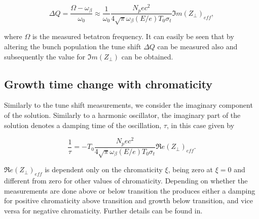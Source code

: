 \begin{equation}
\Delta Q = \frac{\Omega - \omega_{\beta}}{\omega_{0}} \approx \frac{1}{\omega_{0}} \frac{N_{p}ec^{2}}{4\sqrt{\pi}\omega_{\beta} \left( E/e \right)T_{0}\sigma_{t}} \Im{}m\left(  Z_{\perp} \right)_{eff},
\end{equation} 

where $\Omega$ is the measured betatron frequency. It can easily be seen that by altering the bunch population the tune shift $\Delta Q$ can be measured also and subsequently the value for $\Im{}m\left(  Z_{\perp} \right)$ can be obtained.

\subsection{Growth time change with chromaticity}

Similarly to the tune shift measurements, we consider the imaginary component of the solution. Similarly to a harmonic oscillator, the imaginary part of the solution denotes a damping time of the oscillation, $\tau$, in this case given by

\begin{equation}
\frac{1}{\tau} = -T_{0} \frac{N_{p}ec^{2}}{4\sqrt{\pi}\omega_{\beta} \left( E/e \right)T_{0}\sigma_{t}} \Re{}e\left(  Z_{\perp} \right)_{eff}.
\end{equation}

$\Re{}e\left(  Z_{\perp} \right)_{eff}$ is dependent only on the chromaticity $\xi$, being zero at $\xi = 0$ and different from zero for other values of chromaticity. Depending on whether the measurements are done above or below transition the produces either a damping for positive chromaticity above transition and growth below transition, and vice versa for negative chromaticity. Further details can be found in.